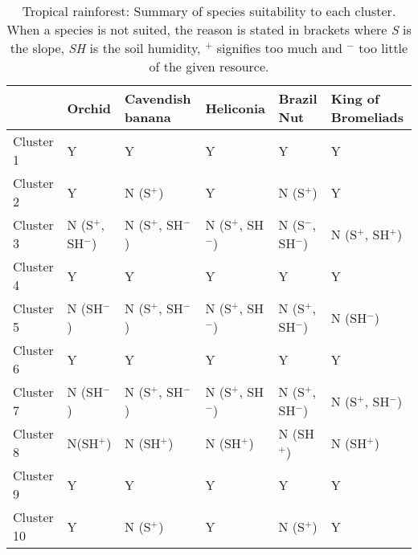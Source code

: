 
\begin{table}[h]
  \centering
	    \begin{tabular}{|p{2cm}|p{2.5cm}|p{2.5cm}|p{2.5cm}|p{2.5cm}|p{2.5cm}|}
		\hline	
		&  \textbf{Orchid} & \textbf{Cavendish banana} & \textbf{Heliconia} & \textbf{Brazil Nut} & \textbf{King of Bromeliads}\\
		\hline	
		Cluster 1 & 
		Y & 
		Y & 
		Y & 
		Y & 
		Y \\
		\hline	
		Cluster 2 & 
		Y & 
		\cellcolor{color_red}N (S$^{+}$) & 
		Y & 
		\cellcolor{color_red}N (S$^{+}$) & 
		Y \\
		\hline	
		Cluster 3 & 
		\cellcolor{color_red}N (S$^{+}$, SH$^{-}$) & 
		\cellcolor{color_red}N (S$^{+}$, SH$^{-}$) & 
		\cellcolor{color_red}N (S$^{+}$, SH$^{-}$) & 
		\cellcolor{color_red}N (S$^{-}$, SH$^{-}$) & 
		\cellcolor{color_red}N (S$^{+}$, SH$^{+}$) \\
		\hline	
		Cluster 4 & 
		Y & 
		Y & 
		Y & 
		Y & 
		Y \\
		\hline	
		Cluster 5 & 
		\cellcolor{color_red}N (SH$^{-}$) & 
		\cellcolor{color_red}N (S$^{+}$, SH$^{-}$) & 
		\cellcolor{color_red}N (S$^{+}$, SH$^{-}$) & 
		\cellcolor{color_red}N (S$^{+}$, SH$^{-}$) & 
		\cellcolor{color_red}N (SH$^{-}$) \\
		\hline	
		Cluster 6 & 
		Y & 
		Y & 
		Y & 
		Y &
		Y \\
		\hline	
		Cluster 7 & 
		\cellcolor{color_red}N (SH$^{-}$) &
		\cellcolor{color_red}N (S$^{+}$, SH$^{-}$) &
		\cellcolor{color_red}N (S$^{+}$, SH$^{-}$) & 
		\cellcolor{color_red}N (S$^{+}$, SH$^{-}$) & 
		\cellcolor{color_red}N (S$^{+}$, SH$^{-}$) \\
		\hline	
		Cluster 8 & 
		\cellcolor{color_red}N(SH$^{+}$) & 
		\cellcolor{color_red}N (SH$^{+}$) & 
		\cellcolor{color_red}N (SH$^{+}$) & 
		\cellcolor{color_red}N (SH$^{+}$) & 
		\cellcolor{color_red}N (SH$^{+}$) \\
		\hline	
		Cluster 9 & 
		Y & 
		Y & 
		Y & 
		Y & 
		Y \\
		\hline	
		Cluster 10 &
		Y & 
		\cellcolor{color_red}N (S$^{+}$) & 
		Y & 
		\cellcolor{color_red}N (S$^{+}$) & 
		Y \\
		\hline	
		\end{tabular}
		\caption{Tropical rainforest: Summary of species suitability to each cluster. When a species is not suited, the reason is stated in brackets where \textit{S} is the slope, \textit{SH} is the soil humidity, $^{+}$ signifies too much and $^{-}$ too little of the given resource.}
	  \label{tab:results_tropical_species_suitability}
\end{table}

